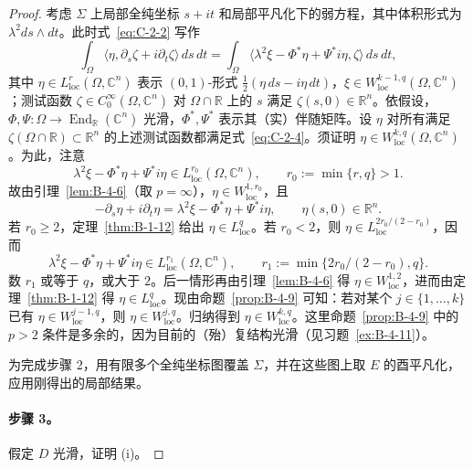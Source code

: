\begin{proof}
考虑 $\Sigma$ 上局部全纯坐标 $s+it$ 和局部平凡化下的弱方程，其中体积形式为 $\lambda^2ds\wedge dt$。此时式~\eqref{eq:C-2-2} 写作
\begin{equation}\label{eq:C-2-4}
  \int_\Omega\langle\eta,\partial_s\zeta+i\partial_t\zeta\rangle\,ds\,dt
  =\int_\Omega\langle\lambda^2\xi-\Phi^*\eta+\Psi^*i\eta,\zeta\rangle\,ds\,dt,
\end{equation}
其中 $\eta\in L^r_{\mathrm{loc}}(\Omega,\mathbb C^n)$ 表示 $(0,1)$-形式 $\frac12(\eta\,ds-i\eta\,dt)$，$\xi\in W^{k-1,q}_{\mathrm{loc}}(\Omega,\mathbb C^n)$；测试函数 $\zeta\in C_0^\infty(\Omega,\mathbb C^n)$ 对 $\Omega\cap\mathbb R$ 上的 $s$ 满足 $\zeta(s,0)\in\mathbb R^n$。依假设，$\Phi,\Psi:\Omega\to\operatorname{End}_{\mathbb R}(\mathbb C^n)$ 光滑，$\Phi^*,\Psi^*$ 表示其（实）伴随矩阵。设 $\eta$ 对所有满足 $\zeta(\Omega\cap\mathbb R)\subset\mathbb R^n$ 的上述测试函数都满足式~\eqref{eq:C-2-4}。须证明 $\eta\in W^{k,q}_{\mathrm{loc}}(\Omega,\mathbb C^n)$。为此，注意
\[
  \lambda^2\xi-\Phi^*\eta+\Psi^*i\eta
  \in L^{r_0}_{\mathrm{loc}}(\Omega,\mathbb C^n),
  \qquad r_0:=\min\{r,q\}>1.
\]
故由引理~\ref{lem:B-4-6}（取 $p=\infty$），$\eta\in W^{1,r_0}_{\mathrm{loc}}$，且
\[
  -\partial_s\eta+i\partial_t\eta
  =\lambda^2\xi-\Phi^*\eta+\Psi^*i\eta,
  \qquad \eta(s,0)\in\mathbb R^n.
\]
若 $r_0\ge2$，定理~\ref{thm:B-1-12} 给出 $\eta\in L^q_{\mathrm{loc}}$。若 $r_0<2$，则 $\eta\in L^{2r_0/(2-r_0)}_{\mathrm{loc}}$，因而
\[
  \lambda^2\xi-\Phi^*\eta+\Psi^*i\eta
  \in L^{r_1}_{\mathrm{loc}}(\Omega,\mathbb C^n),
  \qquad r_1:=\min\{2r_0/(2-r_0),q\}.
\]
数 $r_1$ 或等于 $q$，或大于 $2$。后一情形再由引理~\ref{lem:B-4-6} 得 $\eta\in W^{1,2}_{\mathrm{loc}}$，进而由定理~\ref{thm:B-1-12} 得 $\eta\in L^q_{\mathrm{loc}}$。现由命题~\ref{prop:B-4-9} 可知：若对某个 $j\in\{1,\ldots,k\}$ 已有 $\eta\in W^{j-1,q}_{\mathrm{loc}}$，则 $\eta\in W^{j,q}_{\mathrm{loc}}$。归纳得到 $\eta\in W^{k,q}_{\mathrm{loc}}$。这里命题~\ref{prop:B-4-9} 中的 $p>2$ 条件是多余的，因为目前的（殆）复结构光滑（见习题~\ref{ex:B-4-11}）。

为完成步骤 2，用有限多个全纯坐标图覆盖 $\Sigma$，并在这些图上取 $E$ 的酉平凡化，应用刚得出的局部结果。

\paragraph{步骤 3。} 假定 $D$ 光滑，证明 (i)。


\end{proof}
